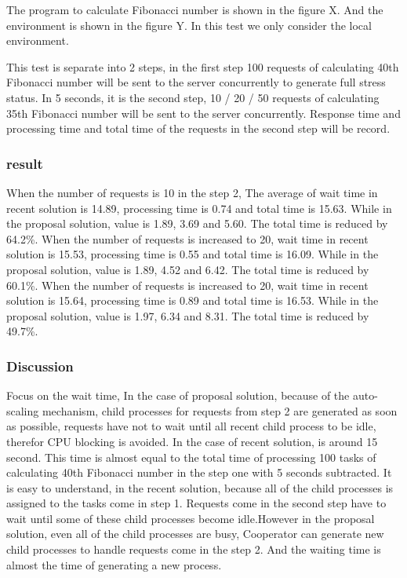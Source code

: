 \documentclass[JIP]{ipsj}
\begin{document}
The program to calculate Fibonacci number is shown in the figure X. And the environment is shown in the figure Y. In this test we only consider the local environment.

This test is separate into 2 steps, in the first step 100 requests of calculating 40th Fibonacci number will be sent to the server concurrently to generate full stress status.
In 5 seconds, it is the second step, 10 / 20 / 50 requests of calculating 35th Fibonacci number will be sent to the server concurrently.
Response time and processing time and total time of the requests in the second step will be record.

\subsubsection{result}
When the number of requests is 10 in the step 2,
The average of wait time in recent solution is 14.89, processing time is 0.74 and total time is 15.63. While in the proposal solution, value is 1.89, 3.69 and 5.60. The total time is reduced by 64.2\%.
When the number of requests is increased to 20,
wait time in recent solution is 15.53, processing time is 0.55 and total time is 16.09. While in the proposal solution, value is 1.89, 4.52 and 6.42. The total	time is reduced by 60.1\%.
When the number of requests is increased to 20,
wait time in recent solution is 15.64, processing time is 0.89 and total time is 16.53. While in the proposal solution, value is 1.97, 6.34 and 8.31. The total time is reduced by 49.7\%.

\subsubsection{Discussion}
Focus on the wait time,
In the case of proposal solution, because of the auto-scaling mechanism, child processes for requests from step 2 are generated as soon as possible, requests have not to wait until all recent child process to be idle, therefor CPU blocking is avoided.
In the case of recent solution, is around 15 second. This time is almost equal to the total time of processing 100 tasks of calculating 40th Fibonacci number in the step one with 5 seconds subtracted. It is easy to understand, in the recent solution, because all of the child processes is assigned to the tasks come in step 1. Requests come in the second step have to wait until some of these child processes become idle.However in the proposal solution, even all of the child processes are busy, Cooperator can generate new child processes to handle requests come in the step 2. And the waiting time is almost the time of generating a new process.
\end{document}
